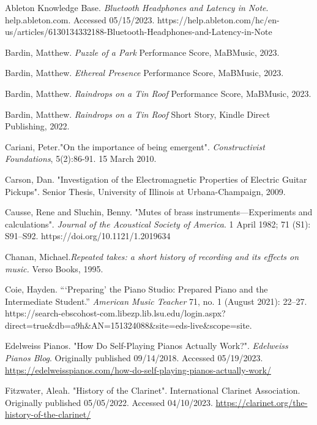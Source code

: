\begin{thebibliography}{99} %

 Ableton Knowledge Base. \emph{Bluetooth Headphones and Latency in Note}. help.ableton.com. Accessed 05/15/2023. https://help.ableton.com/hc/en-us/articles/6130134332188-Bluetooth-Headphones-and-Latency-in-Note

 Bardin, Matthew. \emph{Puzzle of a Park} Performance Score, MaBMusic, 2023.

 Bardin, Matthew. \emph{Ethereal Presence} Performance Score, MaBMusic, 2023.

 Bardin, Matthew. \emph{Raindrops on a Tin Roof} Performance Score, MaBMusic, 2023.

 Bardin, Matthew. \emph{Raindrops on a Tin Roof} Short Story, Kindle Direct Publishing, 2022.

 Cariani, Peter."On the importance of being emergent". \textit{Constructivist Foundations}, 5(2):86-91. 15 March 2010.

 Carson, Dan. "Investigation of the Electromagnetic Properties of Electric Guitar Pickups". Senior Thesis, University of Illinois at Urbana-Champaign, 2009.

 Causse, Rene and  Sluchin, Benny. "Mutes of brass instruments—Experiments and calculations". \textit{Journal of the Acoustical Society of America}. 1 April 1982; 71 (S1): S91–S92. https://doi.org/10.1121/1.2019634

 Chanan, Michael.\emph{Repeated takes: a short history of recording and its effects on music.} Verso Books, 1995.

 Coie, Hayden. “‘Preparing’ the Piano Studio: Prepared Piano and the Intermediate Student.” \textit{American Music Teacher} 71, no. 1 (August 2021): 22–27. https://search-ebscohost-com.libezp.lib.lsu.edu/login.aspx?direct=true\&db=a9h\&AN=151324088\&site=eds-live\&scope=site.

 Edelweiss Pianos. "How Do Self-Playing Pianos Actually Work?". \textit{Edelweiss Pianos Blog}. Originally published 09/14/2018. Accessed 05/19/2023. \url{https://edelweisspianos.com/how-do-self-playing-pianos-actually-work/}

 Fitzwater, Aleah. "History of the Clarinet". International Clarinet Association. Originally published 05/05/2022. Accessed 04/10/2023. \url{https://clarinet.org/the-history-of-the-clarinet/}


\end{thebibliography}
